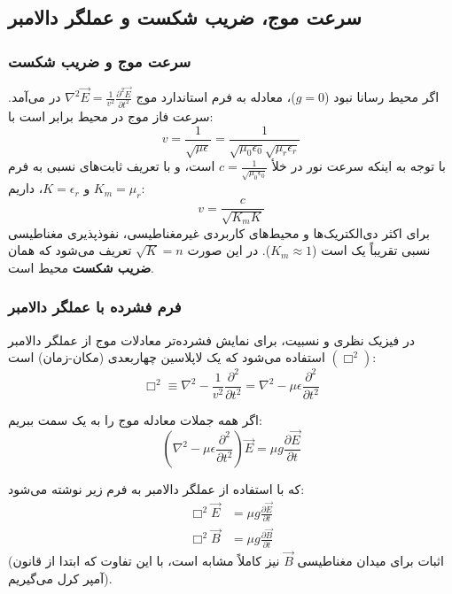 \documentclass[12pt,a4paper]{article}
\begin{document}
\subsection{سرعت موج، ضریب شکست و عملگر دالامبر}
\subsubsection*{سرعت موج و ضریب شکست}
اگر محیط رسانا نبود ($g=0$)، معادله به فرم استاندارد موج $\nabla^2 \vec{E} = \frac{1}{v^2}\frac{\partial^2 \vec{E}}{\partial t^2}$ در می‌آمد. سرعت فاز موج در محیط برابر است با:
\begin{equation}
	v = \frac{1}{\sqrt{\mu\epsilon}} = \frac{1}{\sqrt{\mu_0 \epsilon_0} \sqrt{\mu_r \epsilon_r}}
\end{equation}
با توجه به اینکه سرعت نور در خلأ $c = \frac{1}{\sqrt{\mu_0 \epsilon_0}}$ است، و با تعریف ثابت‌های نسبی به فرم $K_m = \mu_r$ و $K = \epsilon_r$، داریم:
\begin{equation}
	v = \frac{c}{\sqrt{K_m K}}
\end{equation}
برای اکثر دی‌الکتریک‌ها و محیط‌های کاربردی غیرمغناطیسی، نفوذپذیری مغناطیسی نسبی تقریباً یک است ($K_m \approx 1$). در این صورت $\sqrt{K} = n$ تعریف می‌شود که همان \textbf{ضریب شکست } محیط است.

\subsubsection*{فرم فشرده با عملگر دالامبر }
در فیزیک نظری و نسبیت، برای نمایش فشرده‌تر معادلات موج از عملگر دالامبر $(\Box^2)$ استفاده می‌شود که یک لاپلاسین چهاربعدی (مکان-زمان) است:
\begin{equation}
	\Box^2 \equiv \nabla^2 - \frac{1}{v^2}\frac{\partial^2}{\partial t^2} = \nabla^2 - \mu\epsilon\frac{\partial^2}{\partial t^2}
\end{equation}

اگر همه جملات معادله موج را به یک سمت ببریم:
\begin{equation*}
	\left( \nabla^2 - \mu \epsilon \frac{\partial^2}{\partial t^2} \right) \vec{E} = \mu g \frac{\partial \vec{E}}{\partial t}
\end{equation*}

که با استفاده از عملگر دالامبر به فرم زیر نوشته می‌شود:
\begin{align}
	\Box^2 \vec{E} &= \mu g \frac{\partial \vec{E}}{\partial t} \label{eq:boxE} \\
	\Box^2 \vec{B} &= \mu g \frac{\partial \vec{B}}{\partial t} \label{eq:boxB}
\end{align}
(اثبات برای میدان مغناطیسی $\vec{B}$ نیز کاملاً مشابه است، با این تفاوت که ابتدا از قانون آمپر کرل می‌گیریم).
\end{document}
